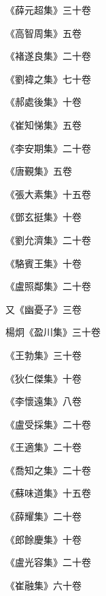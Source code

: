 \begin{pinyinscope}
 《薛元超集》三十卷



 《高智周集》五卷



 《褚遂良集》二十卷



 《劉褘之集》七十卷



 《郝處後集》十卷



 《崔知悌集》五卷



 《李安期集》二十卷



 《唐覲集》五卷



 《張大素集》十五卷



 《鄧玄挺集》十卷



 《劉允濟集》二十卷



 《駱賓王集》十卷



 《盧照鄰集》二十卷



 又《幽憂子》三卷



 楊炯《盈川集》三十卷



 《王勃集》三十卷



 《狄仁傑集》十卷



 《李懷遠集》八卷



 《盧受採集》二十卷



 《王適集》二十卷



 《喬知之集》二十卷



 《蘇味道集》十五卷



 《薛耀集》二十卷



 《郎餘慶集》十卷



 《盧光容集》二十卷



 《崔融集》六十卷




\end{pinyinscope}
